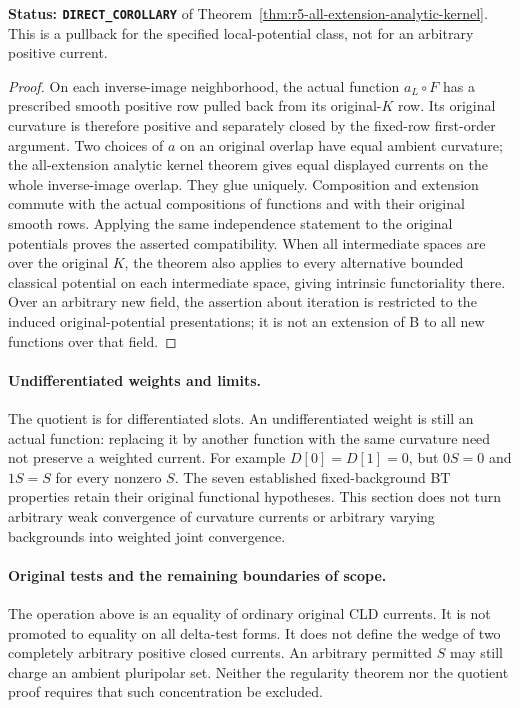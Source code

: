 \noindent\textbf{Status: \texttt{DIRECT\_COROLLARY}} of
Theorem~\ref{thm:r5-all-extension-analytic-kernel}.
This is a pullback for the specified local-potential class,
not for an arbitrary positive current.

\begin{proof}
On each inverse-image neighborhood, the actual function
$a_L\circ F$ has a prescribed smooth positive row pulled
back from its original-$K$ row. Its original curvature is
therefore positive and separately closed by the fixed-row
first-order argument. Two choices of $a$ on an original
overlap have equal ambient curvature; the all-extension
analytic kernel theorem gives equal displayed currents on
the whole inverse-image overlap. They glue uniquely.
Composition and extension commute with the actual
compositions of functions and with their original smooth
rows. Applying the same independence statement to the
original potentials proves the asserted compatibility.
When all intermediate spaces are over the original $K$,
the theorem also applies to every alternative bounded
classical potential on each intermediate space, giving
intrinsic functoriality there. Over an arbitrary new field,
the assertion about iteration is restricted to the induced
original-potential presentations; it is not an extension
of B to all new functions over that field.
\end{proof}

\paragraph{Undifferentiated weights and limits.}
The quotient is for differentiated slots. An undifferentiated
weight is still an actual function: replacing it by another
function with the same curvature need not preserve a weighted
current. For example $D[0]=D[1]=0$, but $0S=0$ and $1S=S$
for every nonzero $S$. The seven established fixed-background
BT properties retain their original functional hypotheses.
This section does not turn arbitrary weak convergence of
curvature currents or arbitrary varying backgrounds into
weighted joint convergence.

\paragraph{Original tests and the remaining boundaries of scope.}
The operation above is an equality of ordinary original
CLD currents. It is not promoted to equality on all delta-test
forms. It does not define the wedge of two completely arbitrary
positive closed currents. An arbitrary permitted $S$ may still
charge an ambient pluripolar set. Neither the regularity
theorem nor the quotient proof requires that such concentration
be excluded.

